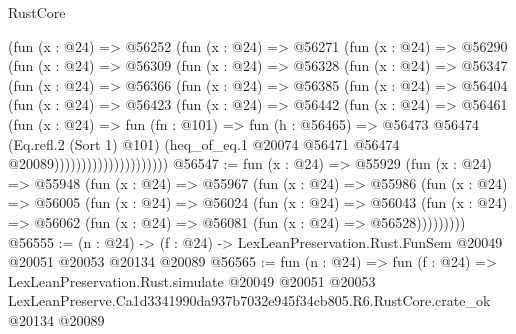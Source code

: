 \begin{lexlean}{RustCore}
\begin{coremodule}
                  (fun (x : @24) =>
                  @56252
                    (fun (x : @24) =>
                    @56271
                      (fun (x : @24) =>
                      @56290
                        (fun (x : @24) =>
                        @56309
                          (fun (x : @24) =>
                          @56328
                            (fun (x : @24) =>
                            @56347
                              (fun (x : @24) =>
                              @56366
                                (fun (x : @24) =>
                                @56385
                                  (fun (x : @24) =>
                                  @56404
                                    (fun (x : @24) =>
                                    @56423
                                      (fun (x : @24) =>
                                      @56442
                                        (fun (x : @24) =>
                                        @56461
                                          (fun (x : @24) =>
                                          fun (fn : @101) =>
                                          fun (h : @56465) =>
                                          @56473
                                            @56474
                                            (Eq.refl.{2} (Sort 1) @101)
                                            (heq_of_eq.{1}
                                              @20074
                                              @56471
                                              @56474
                                              @20089)))))))))))))))))))))
@56547 := fun (x : @24) =>
  @55929
    (fun (x : @24) =>
    @55948
      (fun (x : @24) =>
      @55967
        (fun (x : @24) =>
        @55986
          (fun (x : @24) =>
          @56005
            (fun (x : @24) =>
            @56024
              (fun (x : @24) =>
              @56043
                (fun (x : @24) => @56062 (fun (x : @24) => @56081 (fun (x : @24) => @56528)))))))))
@56555 := (n : @24) ->
  (f : @24) -> LexLeanPreservation.Rust.FunSem @20049 @20051 @20053 @20134 @20089
@56565 := fun (n : @24) =>
  fun (f : @24) =>
  LexLeanPreservation.Rust.simulate
    @20049
    @20051
    @20053
    LexLeanPreserve.Ca1d3341990da937b7032e945f34cb805.R6.RustCore.crate_ok
    @20134
    @20089
\end{coremodule}
\end{lexlean}
